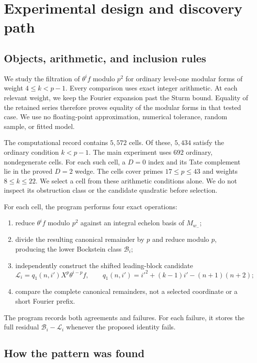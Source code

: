 \section{Experimental design and discovery path}
\label{sec:experimental-design}

\subsection{Objects, arithmetic, and inclusion rules}

We study the filtration of $\theta^i f$ modulo $p^2$ for ordinary level-one
modular forms of weight $4\leq k<p-1$.  Every comparison uses exact integer
arithmetic.  At each relevant weight, we keep the Fourier expansion past the
Sturm bound.  Equality of the retained series therefore proves equality of
the modular forms in that tested case.  We use no floating-point
approximation, numerical tolerance, random sample, or fitted model.

The computational record contains $5{,}572$ cells.  Of these, $5{,}434$
satisfy the ordinary condition $k<p-1$.  The main experiment uses $692$
ordinary, nondegenerate cells.  For each such cell, a $D=0$ index and its Tate
complement lie in the proved $D=2$ wedge.  The cells cover primes
$17\leq p\leq43$ and weights $8\leq k\leq22$.  We select a cell from these
arithmetic conditions alone.  We do not inspect its obstruction class or the
candidate quadratic before selection.

For each cell, the program performs four exact operations:
\begin{enumerate}
\item reduce $\theta^if$ modulo $p^2$ against an integral echelon basis of
      $M_{w_-}$;
\item divide the resulting canonical remainder by $p$ and reduce modulo
      $p$, producing the lower Bockstein class $\mathcal B_i$;
\item independently construct the shifted leading-block candidate
      \[
      \mathcal L_i=q_1(n,i')X^p\theta^{i-p}f,
      \qquad
      q_1(n,i')=i'^2+(k-1)i'-(n+1)(n+2);
      \]
\item compare the complete canonical remainders, not a selected coordinate
      or a short Fourier prefix.
\end{enumerate}
The program records both agreements and failures.  For each failure, it
stores the full residual
$\mathcal B_i-\mathcal L_i$ whenever the proposed identity fails.

\subsection{How the pattern was found}

